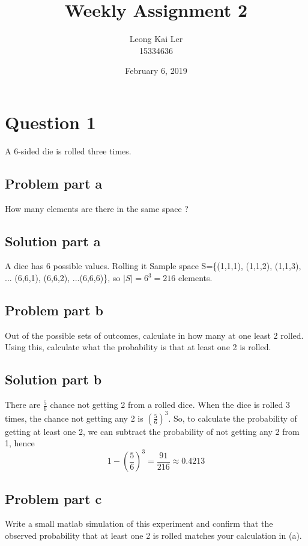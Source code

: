 \documentclass[12pt]{article}%
\makeatletter
\newcommand\abs[1]{\left|#1\right|}
\renewcommand{\maketitle}{\bgroup\setlength{\parindent}{0pt}
\begin{flushleft}
  \textbf{\@title}

  \@author
  \@date
\end{flushleft}\egroup
}
\makeatother
\begin{document}
\title{Weekly Assignment 2}
\author{Leong Kai Ler \\ 15334636 \\   }
\date{February 6, 2019}
\maketitle

\section*{Question 1}
A 6-sided die is rolled three times.
 
\subsection*{Problem part a}
How many elements are there in the same space ?
\subsection*{Solution part a}
A dice has 6 possible values. Rolling it 
Sample space S=\{(1,1,1), (1,1,2),  (1,1,3), ... (6,6,1), (6,6,2), ...(6,6,6)\}, so \begin{math} \abs{S}=6^3=216 \end{math} elements.
\subsection*{Problem part b}
Out of the possible sets of outcomes, calculate in how many at one least 2 rolled. \\
Using this, calculate what the probability is that at least one 2 is rolled.
\subsection*{Solution part b}
There are \begin{math} \frac{5}{6} \end{math} chance not getting 2 from a rolled dice. When the dice is rolled 3 times, the chance not getting any 2 is \begin{math}(\frac{5}{6})^3 \end{math}. So, to calculate the probability of getting at least one 2, we can subtract the probability of not getting any 2 from 1, hence 
\begin{equation*}
1 - (\frac{5}{6})^3 = \frac{91}{216	} \approx 0.4213
\end{equation*}
\newpage
\subsection*{Problem part c}
Write a small matlab simulation of this experiment and confirm that the observed
probability that at least one 2 is rolled matches your calculation in (a).
\end{document}
